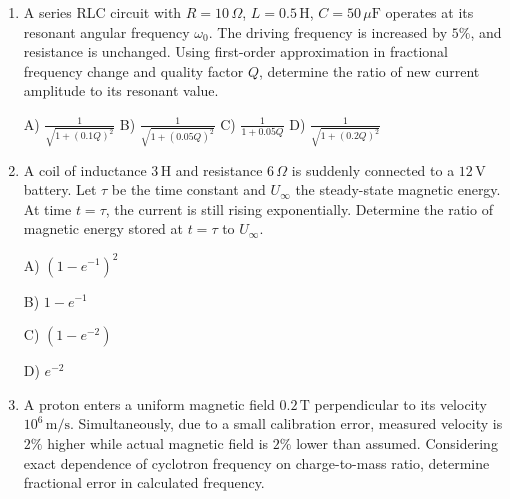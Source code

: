 \documentclass[12pt]{article}
\begin{document}
\begin{enumerate}[leftmargin=*]

A) \(0.48\,\text{W}\)  

B) \(0.52\,\text{W}\)  

C) \(0.44\,\text{W}\)  

D) \(0.60\,\text{W}\)  

\item A series RLC circuit with \(R=10\,\Omega\), \(L=0.5\,\text{H}\), \(C=50\,\mu\text{F}\) operates at its resonant angular frequency \(\omega_0\). The driving frequency is increased by \(5\%\), and resistance is unchanged. Using first-order approximation in fractional frequency change and quality factor \(Q\), determine the ratio of new current amplitude to its resonant value.  

A) \(\displaystyle \frac{1}{\sqrt{1+(0.1Q)^2}}\)  
B) \(\displaystyle \frac{1}{\sqrt{1+(0.05Q)^2}}\)  
C) \(\displaystyle \frac{1}{1+0.05Q}\)  
D) \(\displaystyle \frac{1}{\sqrt{1+(0.2Q)^2}}\)  

\item A coil of inductance \(3\,\text{H}\) and resistance \(6\,\Omega\) is suddenly connected to a \(12\,\text{V}\) battery. Let \(\tau\) be the time constant and \(U_\infty\) the steady-state magnetic energy. At time \(t=\tau\), the current is still rising exponentially. Determine the ratio of magnetic energy stored at \(t=\tau\) to \(U_\infty\).  

A) \((1-e^{-1})^2\)  

B) \(1-e^{-1}\)  

C) \((1-e^{-2})\)  

D) \(e^{-2}\)  

\item A proton enters a uniform magnetic field \(0.2\,\text{T}\) perpendicular to its velocity \(10^6\,\text{m/s}\). Simultaneously, due to a small calibration error, measured velocity is \(2\%\) higher while actual magnetic field is \(2\%\) lower than assumed. Considering exact dependence of cyclotron frequency on charge-to-mass ratio, determine fractional error in calculated frequency.  


\end{enumerate}
\end{document}
